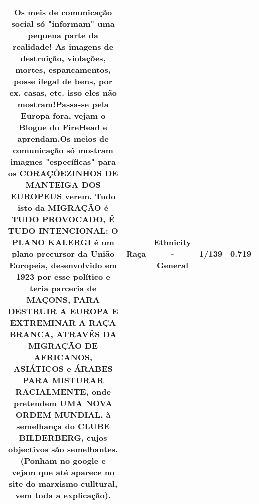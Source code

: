 \documentclass[11pt]{article}
\newlength\mylength
\begin{document}
\begin{center}
\begin{longtable}{|C{.65\mylength}|C{.30\mylength}|C{.12\mylength}|C{.12\mylength}|C{.12\mylength}|}
  \small Os meis de comunicação social só "informam" uma pequena parte da realidade! As imagens de destruição, violações, mortes, espancamentos, posse ilegal de bens, por ex. casas, etc. isso eles não mostram!Passa-se pela Europa fora, vejam o Blogue do FireHead e aprendam.Os meios de comunicação só mostram imagnes "específicas" para os CORAÇÕEZINHOS DE MANTEIGA DOS EUROPEUS verem. Tudo isto da MIGRAÇÃO é TUDO PROVOCADO, É TUDO INTENCIONAL: O PLANO KALERGI é um plano precursor da União Europeia, desenvolvido em 1923 por esse político e teria parceria de MAÇONS, PARA DESTRUIR A EUROPA E EXTREMINAR A \textbf{RAÇA} BRANCA, ATRAVÉS DA MIGRAÇÃO DE AFRICANOS, ASIÁTICOS e ÁRABES PARA MISTURAR RACIALMENTE, onde pretendem UMA NOVA ORDEM MUNDIAL, à semelhança do CLUBE BILDERBERG, cujos objectivos são semelhantes. (Ponham no google e vejam que até aparece no site do marxismo culltural, vem toda a explicação).\normalsize   & Raça & Ethnicity - General & 1/139 & 0.719 \\  \hline

\end{longtable}
\end{center}
\end{document}
